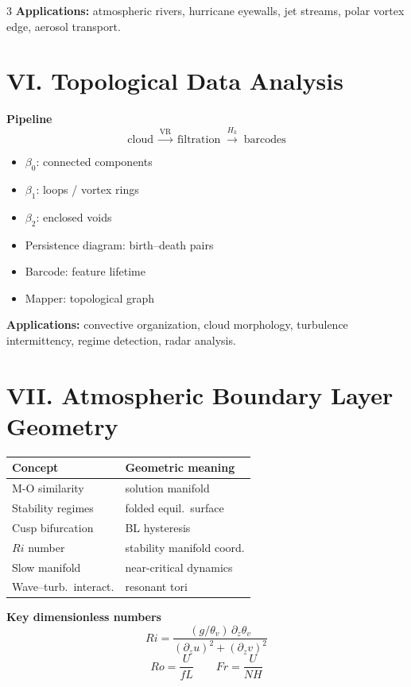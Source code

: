 \documentclass[9pt,letterpaper]{extarticle}
\newcommand{\sect}[1]{\section*{#1}}
\newcommand{\T}[1]{\textbf{#1}}
\begin{document}
\begin{multicols}{3}
\T{Applications:} atmospheric rivers, hurricane eyewalls, jet streams, polar vortex edge, aerosol transport.

\sect{VI. Topological Data Analysis}

\T{Pipeline}
\[\text{cloud}\;\xrightarrow{\text{VR}}\;\text{filtration}\;\xrightarrow{H_k}\;\text{barcodes}\]

\begin{itemize}
  \item $\beta_0$: connected components
  \item $\beta_1$: loops / vortex rings
  \item $\beta_2$: enclosed voids
  \item Persistence diagram: birth--death pairs
  \item Barcode: feature lifetime
  \item Mapper: topological graph
\end{itemize}

\T{Applications:} convective organization, cloud morphology, turbulence intermittency, regime detection, radar analysis.

\sect{VII. Atmospheric Boundary Layer Geometry}

\begin{tabular}{@{}p{1.1in}p{1.1in}@{}}
\toprule
Concept & Geometric meaning \\
\midrule
M-O similarity & solution manifold \\
Stability regimes & folded equil.\ surface \\
Cusp bifurcation & BL hysteresis \\
$Ri$ number & stability manifold coord. \\
Slow manifold & near-critical dynamics \\
Wave--turb.\ interact. & resonant tori \\
\bottomrule
\end{tabular}

\T{Key dimensionless numbers}
\[Ri = \frac{(g/\theta_v)\,\partial_z\theta_v}{(\partial_z u)^2+(\partial_z v)^2}\]
\[Ro = \frac{U}{fL} \qquad Fr = \frac{U}{NH}\]

\end{multicols}
\end{document}
